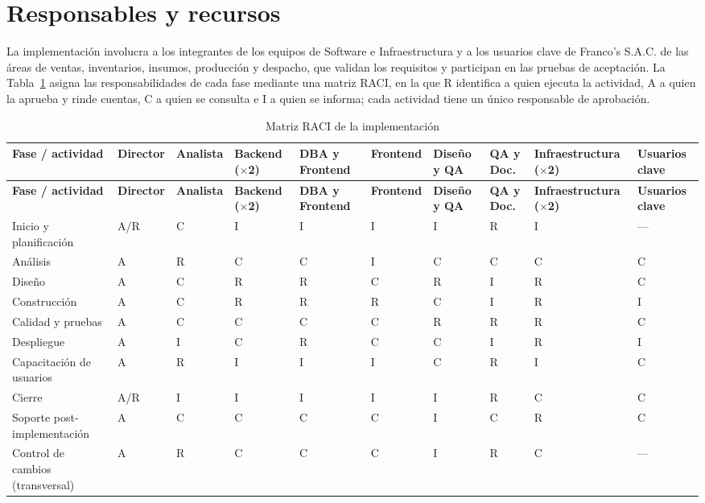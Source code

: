 \section{Responsables y recursos}


La implementación involucra a los integrantes de los equipos de Software e Infraestructura y a los usuarios clave de Franco's S.A.C. de las áreas de ventas, inventarios, insumos, producción y despacho, que validan los requisitos y participan en las pruebas de aceptación. La Tabla~\ref{tab:cap4-3} asigna las responsabilidades de cada fase mediante una matriz RACI, en la que R identifica a quien ejecuta la actividad, A a quien la aprueba y rinde cuentas, C a quien se consulta e I a quien se informa; cada actividad tiene un único responsable de aprobación.


{\scriptsize
\renewcommand{\arraystretch}{1.3}
\begin{longtable}{|>{\raggedright\arraybackslash}p{3.00cm}|>{\centering\arraybackslash}p{1.18cm}|>{\centering\arraybackslash}p{1.18cm}|>{\centering\arraybackslash}p{1.18cm}|>{\centering\arraybackslash}p{1.18cm}|>{\centering\arraybackslash}p{1.18cm}|>{\centering\arraybackslash}p{1.18cm}|>{\centering\arraybackslash}p{1.18cm}|>{\centering\arraybackslash}p{1.18cm}|>{\centering\arraybackslash}p{1.18cm}|}
\caption{Matriz RACI de la implementación}\label{tab:cap4-3}\\
\hline
\textbf{Fase / actividad} & \textbf{Director} & \textbf{Analista} & \textbf{Backend ($\times$2)} & \textbf{DBA y Frontend} & \textbf{Frontend} & \textbf{Diseño y QA} & \textbf{QA y Doc.} & \textbf{Infraestructura ($\times$2)} & \textbf{Usuarios clave} \\
\hline
\endfirsthead
\hline
\textbf{Fase / actividad} & \textbf{Director} & \textbf{Analista} & \textbf{Backend ($\times$2)} & \textbf{DBA y Frontend} & \textbf{Frontend} & \textbf{Diseño y QA} & \textbf{QA y Doc.} & \textbf{Infraestructura ($\times$2)} & \textbf{Usuarios clave} \\
\hline
\endhead
Inicio y planificación & A/R & C & I & I & I & I & R & I & — \\
\hline
Análisis & A & R & C & C & I & C & C & C & C \\
\hline
Diseño & A & C & R & R & C & R & I & R & C \\
\hline
Construcción & A & C & R & R & R & C & I & R & I \\
\hline
Calidad y pruebas & A & C & C & C & C & R & R & R & C \\
\hline
Despliegue & A & I & C & R & C & C & I & R & I \\
\hline
Capacitación de usuarios & A & R & I & I & I & C & R & I & C \\
\hline
Cierre & A/R & I & I & I & I & I & R & C & C \\
\hline
Soporte post-implementación & A & C & C & C & C & I & C & R & C \\
\hline
Control de cambios (transversal) & A & R & C & C & C & I & R & C & — \\
\hline
\end{longtable}
}


